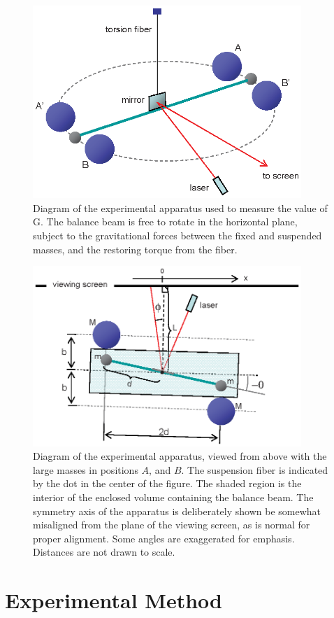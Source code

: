 \documentclass{revtex4}
\begin{document}
\begin{figure}
\includegraphics[width=4in]{apparatus3d.eps}
\caption{\label{fig:apparatus3d}
Diagram of the experimental apparatus used to measure the value of G.
The balance beam is free to rotate in the horizontal plane, subject to
the gravitational forces between the fixed and suspended masses, and the
restoring torque from the fiber. 
}
\end{figure}

\begin{figure}
\includegraphics[width=4in]{apparatus2d.eps}
\caption{\label{fig:apparatus2d}
Diagram of the experimental apparatus, viewed from above with the large
masses in positions $A$, and $B$.  The suspension fiber is indicated by
the dot in the center of the figure.  The shaded region is the interior
of the enclosed volume containing the balance beam.  The symmetry axis of
the apparatus is deliberately shown be somewhat misaligned from the plane
of the viewing screen, as is normal for proper alignment.  Some angles are
exaggerated for emphasis.  Distances are not drawn to scale.
}
\end{figure}

\section{Experimental Method}
\end{document}
